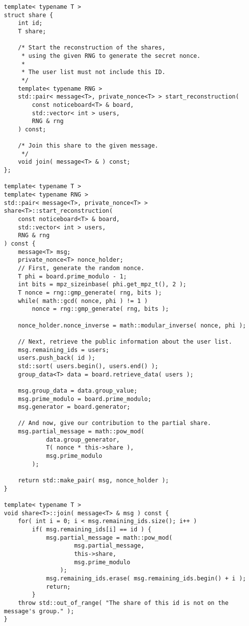 \documentclass[10pt]{article}
\begin{document}
\begin{verbatim}
template< typename T >
struct share {
    int id;
    T share;

    /* Start the reconstruction of the shares,
     * using the given RNG to generate the secret nonce.
     *
     * The user list must not include this ID.
     */
    template< typename RNG >
    std::pair< message<T>, private_nonce<T> > start_reconstruction(
        const noticeboard<T> & board,
        std::vector< int > users,
        RNG & rng
    ) const;

    /* Join this share to the given message.
     */
    void join( message<T> & ) const;
};

template< typename T >
template< typename RNG >
std::pair< message<T>, private_nonce<T> > share<T>::start_reconstruction(
    const noticeboard<T> & board,
    std::vector< int > users,
    RNG & rng
) const {
    message<T> msg;
    private_nonce<T> nonce_holder;
    // First, generate the random nonce.
    T phi = board.prime_modulo - 1;
    int bits = mpz_sizeinbase( phi.get_mpz_t(), 2 );
    T nonce = rng::gmp_generate( rng, bits );
    while( math::gcd( nonce, phi ) != 1 )
        nonce = rng::gmp_generate( rng, bits );

    nonce_holder.nonce_inverse = math::modular_inverse( nonce, phi );

    // Next, retrieve the public information about the user list.
    msg.remaining_ids = users;
    users.push_back( id );
    std::sort( users.begin(), users.end() );
    group_data<T> data = board.retrieve_data( users );

    msg.group_data = data.group_value;
    msg.prime_modulo = board.prime_modulo;
    msg.generator = board.generator;

    // And now, give our contribution to the partial share.
    msg.partial_message = math::pow_mod(
            data.group_generator,
            T( nonce * this->share ),
            msg.prime_modulo
        );

    return std::make_pair( msg, nonce_holder );
}

template< typename T >
void share<T>::join( message<T> & msg ) const {
    for( int i = 0; i < msg.remaining_ids.size(); i++ )
        if( msg.remaining_ids[i] == id ) {
            msg.partial_message = math::pow_mod(
                    msg.partial_message,
                    this->share,
                    msg.prime_modulo
                );
            msg.remaining_ids.erase( msg.remaining_ids.begin() + i );
            return;
        }
    throw std::out_of_range( "The share of this id is not on the message's group." );
}
\end{verbatim}
\end{document}
